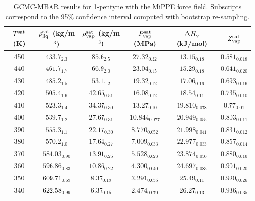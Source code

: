 \documentclass[journal=jctc,manuscript=article]{achemso}
\begin{document}
\begin{table}[htb!]
	\caption{GCMC-MBAR results for 1-pentyne with the MiPPE force field. Subscripts correspond to the 95\% confidence interval computed with bootstrap re-sampling.}
	\begin{center}
		\begin{tabular}{|c|c|c|c|c|c|}
			\hline
			$T^{\rm sat}$ (K) & $\rho_{\rm liq}^{\rm sat}$ (kg/m$^3$) & $\rho_{\rm vap}^{\rm sat}$ (kg/m$^3$) & $P_{\rm vap}^{\rm sat}$ (MPa) & $\Delta H_{\rm v}$ (kJ/mol) & $Z_{\rm vap}^{\rm sat}$ \\ \hline
			450 & $433.7_{2.3}$ & $85.6_{2.5}$ & $27.32_{0.22}$ & $13.15_{0.18}$ & $0.581_{0.018}$ \\
			440 & $461.7_{1.7}$ & $66.9_{2.0}$ & $23.04_{0.15}$ & $15.29_{0.18}$ & $0.641_{0.020}$ \\
			430 & $485.2_{1.5}$ & $53.1_{1.2}$ & $19.32_{0.12}$ & $17.06_{0.16}$ & $0.693_{0.016}$ \\
			420 & $505.4_{1.6}$ & $42.65_{0.51}$ & $16.08_{0.12}$ & $18.54_{0.11}$ & $0.735_{0.010}$ \\
			410 & $523.3_{1.4}$ & $34.37_{0.30}$ & $13.27_{0.10}$ & $19.810_{0.078}$ & $0.77_{0.01}$ \\
			400 & $539.7_{1.2}$ & $27.67_{0.31}$ & $10.844_{0.077}$ & $20.949_{0.055}$ & $0.803_{0.011}$ \\
			390 & $555.3_{1.1}$ & $22.17_{0.30}$ & $8.770_{0.052}$ & $21.998_{0.041}$ & $0.831_{0.012}$ \\
			380 & $570.2_{1.0}$ & $17.64_{0.27}$ & $7.009_{0.033}$ & $22.977_{0.033}$ & $0.857_{0.014}$ \\
			370 & $584.03_{0.90}$ & $13.91_{0.25}$ & $5.528_{0.028}$ & $23.874_{0.050}$ & $0.880_{0.016}$ \\
			360 & $596.86_{0.83}$ & $10.86_{0.22}$ & $4.300_{0.040}$ & $24.697_{0.083}$ & $0.901_{0.020}$ \\
			350 & $609.71_{0.69}$ & $8.37_{0.19}$ & $3.291_{0.055}$ & $25.49_{0.11}$ & $0.920_{0.026}$ \\
			340 & $622.58_{0.99}$ & $6.37_{0.15}$ & $2.474_{0.070}$ & $26.27_{0.13}$ & $0.936_{0.035}$ \\
			\hline
		\end{tabular}
	\end{center}
\end{table}
\end{document}
